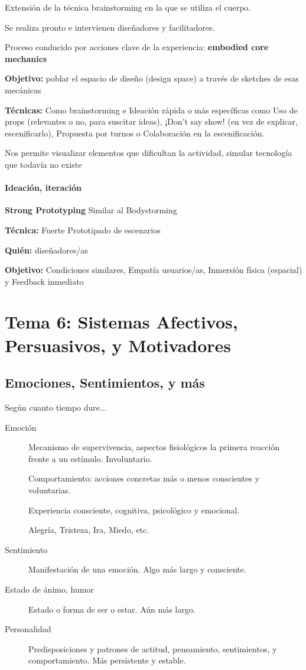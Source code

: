 \documentclass[12pt, twoside, openright]{report} %
\begin{document}
Extensión de la técnica brainstorming en la que se utiliza el cuerpo.

Se realiza pronto e intervienen diseñadores y facilitadores.

Proceso conducido por acciones clave de la experiencia: \textbf{embodied core mechanics}

\textbf{Objetivo:} poblar el espacio de diseño (design space) a través de sketches de esas mecánicas

\textbf{Técnicas:} Como brainstorming e Ideación rápida o más específicas como Uso de props (relevantes o no, para suscitar ideas), ¡Don’t say show! (en vez de explicar, escenificarlo), Propuesta por turnos o Colaboración en la escenificación.

Nos permite visualizar elementos que dificultan la actividad, simular tecnología que todavía no existe

\subsubsection{Ideación, iteración}
\textbf{Strong Prototyping} Similar al Bodystorming

\textbf{Técnica:} Fuerte Prototipado de escenarios

\textbf{Quién:} diseñadores/as

\textbf{Objetivo:} Condiciones similares, Empatía usuarios/as, Inmersión física (espacial) y Feedback inmediato


\chapter{Tema 6: Sistemas Afectivos, Persuasivos, y Motivadores}

\section{Emociones, Sentimientos, y más}
Según cuanto tiempo dure...
\begin{description}
	\item[Emoción] Mecanismo de supervivencia, aspectos fisiológicos la primera reacción frente a un estímulo. Involuntario.

	      Comportamiento: acciones concretas más o menos conscientes y voluntarias.

	      Experiencia consciente, cognitiva, psicológico y emocional.

	      Alegría, Tristeza, Ira, Miedo, etc.
	\item[Sentimiento] Manifestación de una emoción. Algo más largo y consciente.
	\item[Estado de ánimo, humor] Estado o forma de ser o estar. Aún más largo.
	\item[Personalidad] Predisposiciones y patrones de actitud, pensamiento, sentimientos, y comportamiento. Más persistente y estable.
\end{description}
\end{document}
